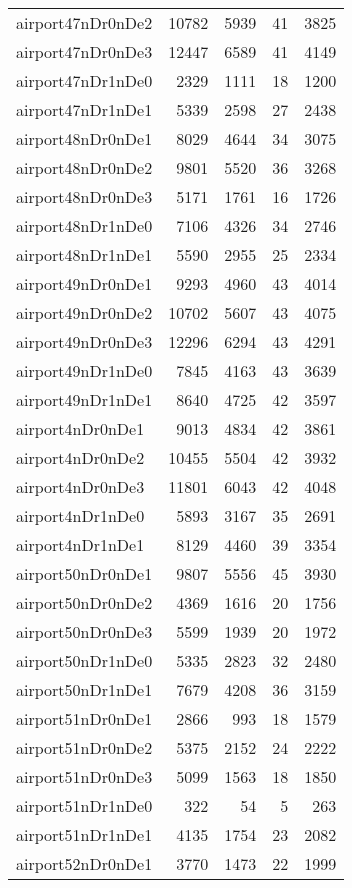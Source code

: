 \begin{longtable}{lrrrr}
airport47nDr0nDe2 & 10782 & 5939 & 41 & 3825 \\
airport47nDr0nDe3 & 12447 & 6589 & 41 & 4149 \\
airport47nDr1nDe0 & 2329 & 1111 & 18 & 1200 \\
airport47nDr1nDe1 & 5339 & 2598 & 27 & 2438 \\
airport48nDr0nDe1 & 8029 & 4644 & 34 & 3075 \\
airport48nDr0nDe2 & 9801 & 5520 & 36 & 3268 \\
airport48nDr0nDe3 & 5171 & 1761 & 16 & 1726 \\
airport48nDr1nDe0 & 7106 & 4326 & 34 & 2746 \\
airport48nDr1nDe1 & 5590 & 2955 & 25 & 2334 \\
airport49nDr0nDe1 & 9293 & 4960 & 43 & 4014 \\
airport49nDr0nDe2 & 10702 & 5607 & 43 & 4075 \\
airport49nDr0nDe3 & 12296 & 6294 & 43 & 4291 \\
airport49nDr1nDe0 & 7845 & 4163 & 43 & 3639 \\
airport49nDr1nDe1 & 8640 & 4725 & 42 & 3597 \\
airport4nDr0nDe1 & 9013 & 4834 & 42 & 3861 \\
airport4nDr0nDe2 & 10455 & 5504 & 42 & 3932 \\
airport4nDr0nDe3 & 11801 & 6043 & 42 & 4048 \\
airport4nDr1nDe0 & 5893 & 3167 & 35 & 2691 \\
airport4nDr1nDe1 & 8129 & 4460 & 39 & 3354 \\
airport50nDr0nDe1 & 9807 & 5556 & 45 & 3930 \\
airport50nDr0nDe2 & 4369 & 1616 & 20 & 1756 \\
airport50nDr0nDe3 & 5599 & 1939 & 20 & 1972 \\
airport50nDr1nDe0 & 5335 & 2823 & 32 & 2480 \\
airport50nDr1nDe1 & 7679 & 4208 & 36 & 3159 \\
airport51nDr0nDe1 & 2866 & 993 & 18 & 1579 \\
airport51nDr0nDe2 & 5375 & 2152 & 24 & 2222 \\
airport51nDr0nDe3 & 5099 & 1563 & 18 & 1850 \\
airport51nDr1nDe0 & 322 & 54 & 5 & 263 \\
airport51nDr1nDe1 & 4135 & 1754 & 23 & 2082 \\
airport52nDr0nDe1 & 3770 & 1473 & 22 & 1999 \\

\end{longtable}
